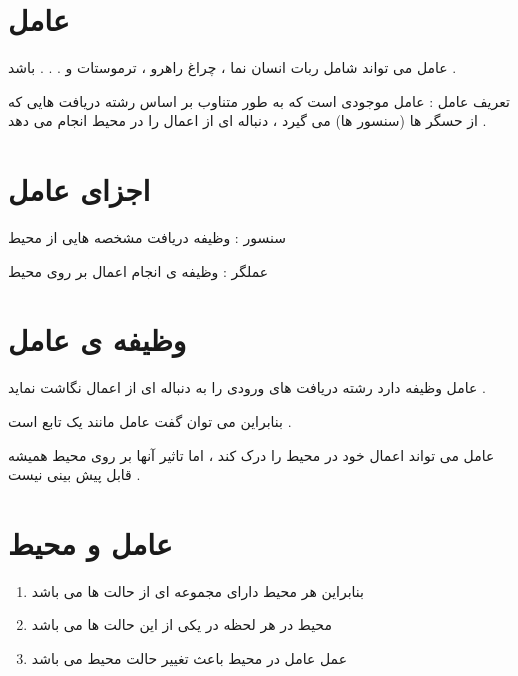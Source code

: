 \documentclass[12pt]{article}
\begin{document}
\tableofcontents






\section{عامل}

\noindent
عامل می تواند شامل ربات انسان نما ، چراغ راهرو ، ترموستات و . . . باشد .
\newline

\noindent
تعریف عامل : عامل موجودی است که به طور متناوب بر اساس رشته دریافت هایی که از حسگر ها (سنسور ها) می گیرد ، دنباله ای از اعمال را در محیط انجام می دهد .




\section{اجزای عامل}


\noindent
سنسور 
 : وظیفه دریافت مشخصه هایی از محیط 



\noindent
عملگر 
: وظیفه ی انجام اعمال بر روی محیط






\section{وظیفه ی عامل}

\noindent
عامل وظیفه دارد رشته دریافت های ورودی را به دنباله ای از اعمال نگاشت نماید .

\noindent
بنابراین می توان گفت عامل مانند یک تابع است .

\noindent
عامل می تواند اعمال خود در محیط را درک کند ، اما تاثیر آنها بر روی محیط همیشه قابل پیش بینی نیست .






\section{عامل و محیط}


\begin{enumerate}
	\item بنابراین هر محیط دارای مجموعه ای از حالت ها می باشد
	\item محیط در هر لحظه در یکی از این حالت ها می باشد
	\item عمل عامل در محیط باعث تغییر حالت محیط می باشد 
\end{enumerate}
\end{document}
